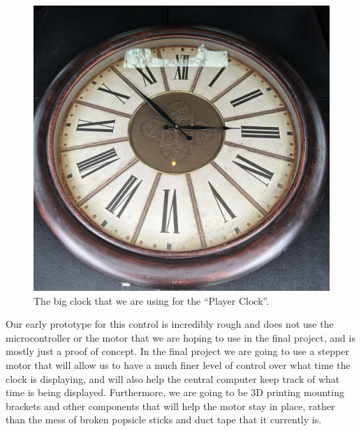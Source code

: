 \documentclass[conference]{IEEEtran}
\begin{document}
\begin{figure}[ht]
    \centering
    \includegraphics[width=0.85\columnwidth]{Images/big-clock.jpg}
    \caption{The big clock that we are using for the ``Player Clock''.}
\end{figure}

Our early prototype for this control is incredibly rough and does not use the microcontroller or the
motor that we are hoping to use in the final project, and is mostly just a proof of concept. In the
final project we are going to use a stepper motor that will allow us to have a much finer level of
control over what time the clock is displaying, and will also help the central computer keep track of
what time is being displayed. Furthermore, we are going to be 3D printing mounting brackets and other
components that will help the motor stay in place, rather than the mess of broken popsicle sticks and
duct tape that it currently is.
\end{document}
